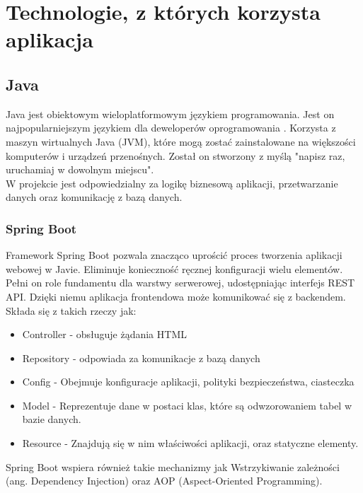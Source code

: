 \chapter{Technologie, z których korzysta aplikacja}
\section{Java}
Java jest obiektowym wieloplatformowym językiem programowania. Jest on najpopularniejszym językiem dla deweloperów oprogramowania \cite{JavaMicrosoft}. Korzysta z maszyn wirtualnych Java (JVM), które mogą zostać zainstalowane na większości komputerów i urządzeń przenośnych. Został on stworzony z myślą "napisz raz, uruchamiaj w dowolnym miejscu". 
\\W projekcie jest odpowiedzialny za logikę biznesową aplikacji, przetwarzanie danych oraz komunikację z bazą danych.
\subsection*{Spring Boot}
Framework Spring Boot pozwala znacząco uprościć proces tworzenia aplikacji webowej w Javie. Eliminuje konieczność ręcznej konfiguracji wielu elementów. Pełni on role fundamentu dla warstwy serwerowej, udostępniając interfejs REST API. Dzięki niemu aplikacja frontendowa może komunikować się z backendem. Składa się z takich rzeczy jak:
\begin{itemize}
	\item Controller - obsługuje żądania HTML
	\item Repository - odpowiada za komunikacje z bazą danych
	\item Config - Obejmuje konfiguracje aplikacji, polityki bezpieczeństwa, ciasteczka
	\item Model - Reprezentuje dane w postaci klas, które są odwzorowaniem tabel w bazie danych.
	\item Resource - Znajdują się w nim właściwości aplikacji, oraz statyczne elementy.
\end{itemize}
Spring Boot wspiera również takie mechanizmy jak Wstrzykiwanie zależności (ang. Dependency Injection) oraz AOP (Aspect-Oriented Programming).
